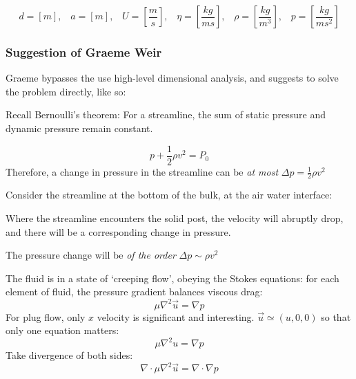 \documentclass[]{article}
\begin{document}
\[ d = [m],\;\;\; a = [m],\;\;\; U = \left[\frac{m}{s} \right],\;\;\;
 \eta = \left[\frac{kg}{ms} \right],\;\;\; \rho = \left[\frac{kg}{m^{3}} \right]
 ,\;\;\; p = \left[ \frac{kg}{m s^{2}} \right] \]


\subsubsection*{Suggestion of Graeme Weir}

Graeme bypasses the use high-level dimensional analysis, and suggests to solve the problem directly, like so:

Recall Bernoulli's theorem: For a streamline, the sum of static pressure and dynamic pressure remain constant.

\[ p + \frac{1}{2}\rho v^2 = P_0 \]
Therefore, a change in pressure in the streamline can be \emph{at most} $\Delta p = \frac{1}{2} \rho v^2$

\vspace*{1em}
Consider the streamline at the bottom of the bulk, at the air water interface:


Where the streamline encounters the solid post, the velocity will abruptly drop, and there will be a corresponding change in pressure.

The pressure change will be \emph{of the order} $\Delta p \sim \rho v^2$

\vspace*{1em}
The fluid is in a state of `creeping flow', obeying the Stokes equations: for each element of fluid, the pressure gradient balances viscous drag:
\[ \mu \nabla^2 \vec{u} = \nabla p  \]
For plug flow, only $x$ velocity is significant and interesting. $\vec{u} \simeq
 (u,0,0)$ so that only one equation matters:
\[ \mu \nabla^2 u = \nabla p  \]
Take divergence of both sides:
\[ \nabla \cdot \mu \nabla^2 \vec{u} = \nabla \cdot \nabla p \]
\end{document}
